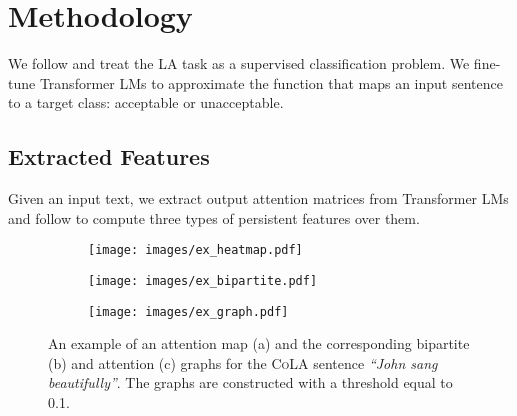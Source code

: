 \documentclass[11pt]{article}
\begin{document}
\section{Methodology}
We follow \citealp{warstadt-etal-2019-neural} and treat the LA task as a supervised classification problem.
We fine-tune Transformer LMs to approximate the function that maps an input sentence to a target class: acceptable or unacceptable. 
\subsection{Extracted Features}\label{sec:tda_method}
Given an input text, we extract output attention matrices from Transformer LMs and follow \citealp{kushnareva-etal-2021-artificial} to compute three types of persistent features over them.



\begin{figure*}[h!]
\centering
\begin{subfigure}{0.3\textwidth}
    \texttt{[image: images/ex\_heatmap.pdf]}
    \caption{}
    \label{fig:first}
\end{subfigure}
\hfill
\begin{subfigure}{0.3\textwidth}
    \texttt{[image: images/ex\_bipartite.pdf]}
    \caption{}
    \label{fig:second}
\end{subfigure}
\hfill
\begin{subfigure}{0.36\textwidth}
    \texttt{[image: images/ex\_graph.pdf]}
    \caption{}
    \label{fig:third}
\end{subfigure}

\caption{An example of an attention map (a) and the corresponding bipartite (b) and attention (c) graphs for the \textsc{CoLA} sentence \textit{``John sang beautifully''}.  The graphs are constructed with a threshold equal to 0.1.}
\label{fig:ex_features}
\end{figure*}
\end{document}
